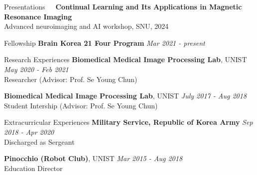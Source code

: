 \documentclass{resume} %
\begin{document}
\begin{rSection}{Presentations}
\textbullet~\,\, \textbf{Continual Learning and Its Applications in Magnetic Resonance Imaging}
\\ \hspace*{1.5em}Advanced neuroimaging and AI workshop, SNU, 2024 \\
\end{rSection}



\begin{rSection}{Fellowship}
{\bf Brain Korea 21 Four Program} \hfill {\it Mar 2021 - present} \\
\end{rSection}











\newpage

\begin{rSection}{Research Experiences}
{\bf Biomedical Medical Image Processing Lab}{, UNIST} \hfill {\it May 2020 - Feb 2021}
\\{Researcher (Advisor: Prof. Se Young Chun)} 

{\bf Biomedical Medical Image Processing Lab}{, UNIST}  \hfill {\it July 2017 - Aug 2018}
\\{Student Intership (Advisor: Prof. Se Young Chun)} \\
\end{rSection}


\begin{rSection}{Extracurricular Experiences}
{\bf Military Service, Republic of Korea Army} \hfill {\it Sep 2018 - Apr 2020}
\\{Discharged as Sergeant}

{\bf Pinocchio (Robot Club)}{, UNIST} \hfill {\it Mar 2015 - Aug 2018}
\\{Education Director} 
\end{rSection}
\end{document}
